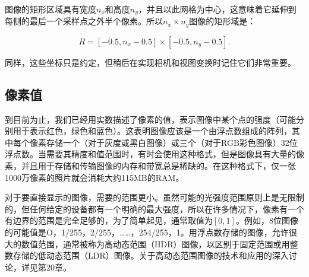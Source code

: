 \documentclass[lang=cn,12pt,marginpar=margintrue]{elegantbook}
\begin{document}


图像的矩形区域具有宽度$n_x$和高度$n_y$，并且以此网格为中心，这意味着它延伸到每侧的最后一个采样点之外半个像素。所以$n_x \times n_y$图像的矩形域是：

\[
    R=[-0.5,n_x-0.5]\times [-0.5,n_y-0.5].
\]

同样，这些坐标只是约定，但稍后在实现相机和视图变换时记住它们非常重要。

\subsection{像素值}

到目前为止，我们已经用实数描述了像素的值，表示图像中某个点的强度（可能分别用于表示红色，绿色和蓝色）。这表明图像应该是一个由浮点数组成的阵列，其中每个像素存储一个（对于灰度或黑白图像）或三个（对于RGB彩色图像）32位浮点数。当需要其精度和值范围时，有时会使用这种格式，但是图像具有大量的像素，并且用于存储和传输图像的内存和带宽总是稀缺的。在这种格式下，仅一张1000万像素的照片就会消耗大约115MB的RAM。


对于要直接显示的图像，需要的范围更小。虽然可能的光强度范围原则上是无限制的，但任何给定的设备都有一个明确的最大强度，所以在许多情况下，像素有一个有边界的范围是完全足够的，为了简单起见，通常取值为$[0,1]$。例如，8位图像的可能值是O，1/255，2/255，……，254/255，1。用浮点数存储的图像，允许很大的数值范围，通常被称为高动态范围（HDR）图像，以区别于固定范围或用整数存储的低动态范围（LDR）图像。关于高动态范围图像的技术和应用的深入讨论，详见第20章。
\end{document}
